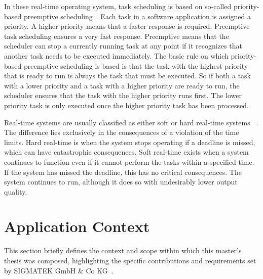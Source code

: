 \documentclass[MMR,Master,english]{twbook}
\begin{document}
\noindent In these real-time operating system, task scheduling is based on so-called priority-based preemptive scheduling~\cite{buttazzoHardRealtimeComputing2024}. Each task in a software application is assigned a priority. A higher priority means that a faster response is required. Preemptive task scheduling ensures a very fast response. Preemptive means that the scheduler can stop a currently running task at any point if it recognizes that another task needs to be executed immediately. The basic rule on which priority-based preemptive scheduling is based is that the task with the highest priority that is ready to run is always the task that must be executed. So if both a task with a lower priority and a task with a higher priority are ready to run, the scheduler ensures that the task with the higher priority runs first. The lower priority task is only executed once the higher priority task has been processed.

\bigskip \noindent Real-time systems are usually classified as either soft or hard real-time systems ~\cite{lipariRealTimeSchedulingHard}. The difference lies exclusively in the consequences of a violation of the time limits. Hard real-time is when the system stops operating if a deadline is missed, which can have catastrophic consequences. Soft real-time exists when a system continues to function even if it cannot perform the tasks within a specified time. If the system has missed the deadline, this has no critical consequences. The system continues to run, although it does so with undesirably lower output quality.

\section{Application Context}\label{sec:application_context}
This section briefly defines the context and scope within which this master's thesis was composed, highlighting the specific contributions and requirements set by SIGMATEK GmbH \& Co KG~\cite{pixelartSIGMATEKKompletteAutomatisierungssysteme}.
\end{document}
